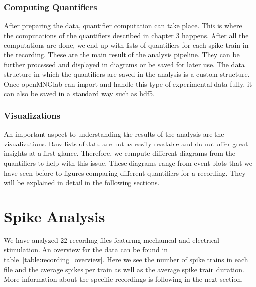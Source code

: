 \subsubsection{Computing Quantifiers}
After preparing the data, quantifier computation can take place. This is where the computations of the quantifiers described in chapter 3 happens. After all the computations are done, we end up with lists of quantifiers for each spike train in the recording. These are the main result of the analysis pipeline. They can be further processed and displayed in diagrams or be saved for later use. The data structure in which the quantifiers are saved in the analysis is a custom structure. Once openMNGlab can import and handle this type of experimental data fully, it can also be saved in a standard way such as hdf5.

\subsubsection{Visualizations}
An important aspect to understanding the results of the analysis are the visualizations. Raw lists of data are not as easily readable and do not offer great insights at a first glance. Therefore, we compute different diagrams from the quantifiers to help with this issue. These diagrams range from event plots that we have seen before to figures comparing different quantifiers for a recording. They will be explained in detail in the following sections.

\section{Spike Analysis}
We have analyzed 22 recording files featuring  mechanical and electrical stimulation. An overview for the data can be found in table~\ref{table:recording_overview}. Here we see the number of spike trains in each file and the average spikes per train as well as the average spike train duration. More information about the specific recordings is following in the next section.

